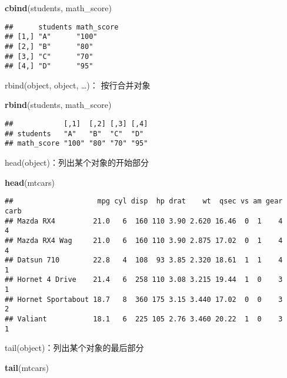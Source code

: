 \documentclass[]{book}
\newenvironment{Shaded}{\begin{snugshade}}{\end{snugshade}}
\newcommand{\KeywordTok}[1]{\textcolor[rgb]{0.13,0.29,0.53}{\textbf{#1}}}
\newcommand{\NormalTok}[1]{#1}
\begin{document}
\begin{Shaded}
\begin{Highlighting}[]
\KeywordTok{cbind}\NormalTok{(students, math_score)}
\end{Highlighting}
\end{Shaded}

\begin{verbatim}
##      students math_score
## [1,] "A"      "100"     
## [2,] "B"      "80"      
## [3,] "C"      "70"      
## [4,] "D"      "95"
\end{verbatim}

rbind(object, object, \ldots{})： 按行合并对象

\begin{Shaded}
\begin{Highlighting}[]
\KeywordTok{rbind}\NormalTok{(students, math_score)}
\end{Highlighting}
\end{Shaded}

\begin{verbatim}
##            [,1]  [,2] [,3] [,4]
## students   "A"   "B"  "C"  "D" 
## math_score "100" "80" "70" "95"
\end{verbatim}

head(object)：列出某个对象的开始部分

\begin{Shaded}
\begin{Highlighting}[]
\KeywordTok{head}\NormalTok{(mtcars)}
\end{Highlighting}
\end{Shaded}

\begin{verbatim}
##                    mpg cyl disp  hp drat    wt  qsec vs am gear carb
## Mazda RX4         21.0   6  160 110 3.90 2.620 16.46  0  1    4    4
## Mazda RX4 Wag     21.0   6  160 110 3.90 2.875 17.02  0  1    4    4
## Datsun 710        22.8   4  108  93 3.85 2.320 18.61  1  1    4    1
## Hornet 4 Drive    21.4   6  258 110 3.08 3.215 19.44  1  0    3    1
## Hornet Sportabout 18.7   8  360 175 3.15 3.440 17.02  0  0    3    2
## Valiant           18.1   6  225 105 2.76 3.460 20.22  1  0    3    1
\end{verbatim}

tail(object)：列出某个对象的最后部分

\begin{Shaded}
\begin{Highlighting}[]
\KeywordTok{tail}\NormalTok{(mtcars)}
\end{Highlighting}
\end{Shaded}
\end{document}

